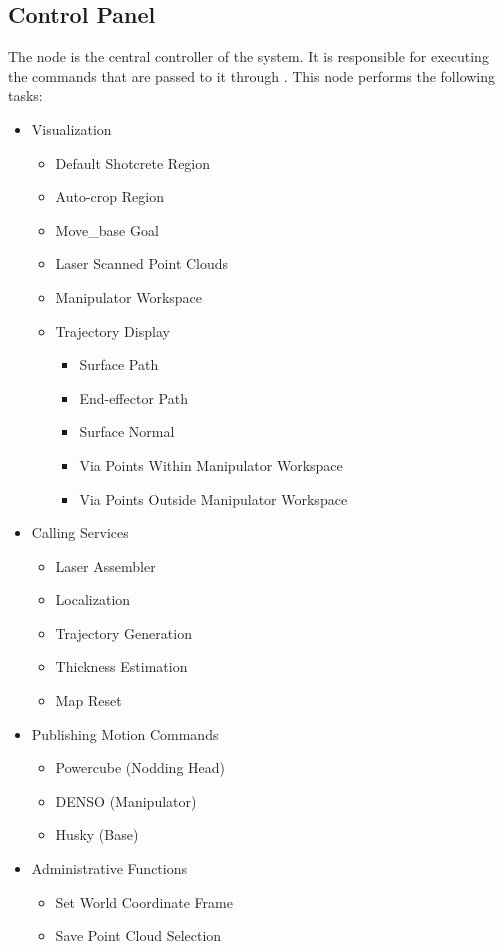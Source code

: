 \subsection{Control Panel}
The  node is the central controller of the system. It is responsible for executing the commands that are passed to it through . This node performs the following tasks:
\begin{itemize}
\item Visualization
\begin{itemize}
\item Default Shotcrete Region
\item Auto-crop Region
\item Move\_base Goal
\item Laser Scanned Point Clouds
\item Manipulator Workspace
\item Trajectory Display
\begin{itemize}
\item Surface Path
\item End-effector Path
\item Surface Normal
\item Via Points Within Manipulator Workspace
\item Via Points Outside Manipulator Workspace
\end{itemize}
\end{itemize}
\item Calling Services
\begin{itemize}
\item Laser Assembler
\item Localization
\item Trajectory Generation
\item Thickness Estimation
\item Map Reset
\end{itemize}
\item Publishing Motion Commands
\begin{itemize}
\item Powercube (Nodding Head)
\item DENSO (Manipulator)
\item Husky (Base)
\end{itemize}
\item Administrative Functions
\begin{itemize}
\item Set World Coordinate Frame
\item Save Point Cloud Selection

\end{itemize}
\end{itemize}
